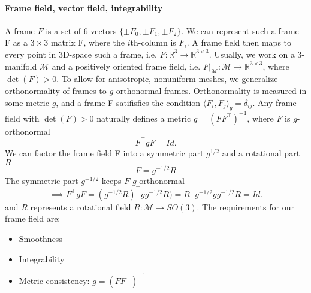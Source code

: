 \documentclass[../thesis.tex]{subfiles}
\begin{document}
\paragraph{Frame field, vector field, integrability}


\newpage
A frame $F$ is a set of 6 vectors $\{\pm F_0, \pm F_1, \pm F_2 \}$.
We can represent such a frame F as a $3\times3$ matrix F, where the $i$th-column is $F_i$.
A frame field then maps to every point in 3D-space such a frame, i.e. $F: \mathbb{R}^3 \to \mathbb{R}^{3\times3}$.
Usually, we work on a 3-manifold $\mathcal{M}$ and a positively oriented frame field, i.e.
$F\vert_{\mathcal{M}}: \mathcal{M} \to \mathbb{R}^{3\times3}$, where $\det(F)>0$.
To allow for anisotropic, nonuniform meshes, we generalize orthonormality of frames to
$g$-orthonormal frames. Orthonormality is measured in some metric $g$, and a frame F satifisfies the condition
$\langle F_i, F_j \rangle _g = \delta_{ij}$.
Any frame field with $\det(F)>0$ naturally defines a metric $g= (FF^{\top})^{-1}$, where $F$ is $g$-orthonormal
$$F^{\top}gF = Id.$$
We can factor the frame field F into a symmetric part $g^{1/2}$ and a rotational part $R$
$$F = g^{-1/2}R$$
The symmetric part $g^{-1/2}$ keeps $F$ $g$-orthonormal
$$ \implies F^{\top}gF = (g^{-1/2}R)^{\top}gg^{-1/2}R)=R^{\top}g^{-1/2}gg^{-1/2}R =Id.$$
and $R$ represents a rotational field $R: \mathcal{M} \to SO(3)$.
The requirements for our frame field are:
\begin{itemize}
  \item Smoothness
  \item Integrability
  \item Metric consistency: $g = (FF^{\top})^{-1}$
\end{itemize}
\end{document}
